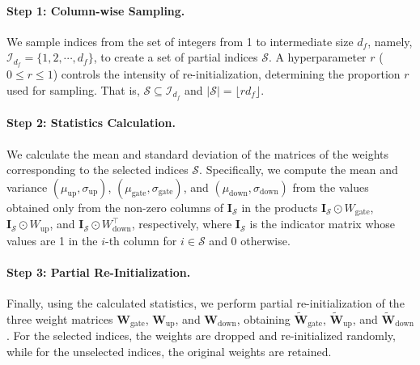 \paragraph{Step 1: Column-wise Sampling.}
We sample indices from the set of integers from 1 to intermediate size \(d_f\), namely,  $\mathcal{I}_{d_f}=\{ 1, 2, \cdots, d_f \}$, to create a set of partial indices \(\mathcal{S}\). A hyperparameter $r$ ($0 \leq r \leq 1$) controls the intensity of re-initialization, determining the proportion \(r\) used for sampling. That is, $\mathcal{S} \subseteq \mathcal{I}_{d_f}$ and $\left| \mathcal{S} \right| = \lfloor r d_f \rfloor$.


\paragraph{Step 2: Statistics Calculation.}  
We calculate the mean and standard deviation of the matrices of the weights corresponding to the selected indices $\mathcal{S}$. Specifically, we compute the mean and variance \((\mu_\text{up}, \sigma_\text{up})\), \((\mu_\text{gate}, \sigma_\text{gate})\), and \((\mu_\text{down}, \sigma_\text{down})\) 
from the values obtained only from the non-zero columns of $\mathbf{I}_{\mathcal{S}}$ in the products 
$\mathbf{I}_{\mathcal{S}}\odot W_{\text{gate}}$,
$\mathbf{I}_{\mathcal{S}} \odot W_{\text{up}}$, and 
$\mathbf{I}_{\mathcal{S}} \odot W_{\text{down}}^\top$, respectively, where $\mathbf{I}_{\mathcal{S}}$ is the indicator matrix whose values are 1 in the $i$-th column for $i\in\mathcal{S}$ and 0 otherwise.


\paragraph{Step 3: Partial Re-Initialization.}
Finally, using the calculated statistics, we perform partial re-initialization of the three weight matrices \(\mathbf{W}_\text{gate}\), \(\mathbf{W}_\text{up}\), and \(\mathbf{W}_\text{down}\), obtaining \(\widetilde{\mathbf{W}}_\text{gate}\), \(\widetilde{\mathbf{W}}_\text{up}\), and \(\widetilde{\mathbf{W}}_\text{down}\). 
For the selected indices, the weights are dropped and re-initialized randomly, while for the unselected indices, the original weights are retained. 

